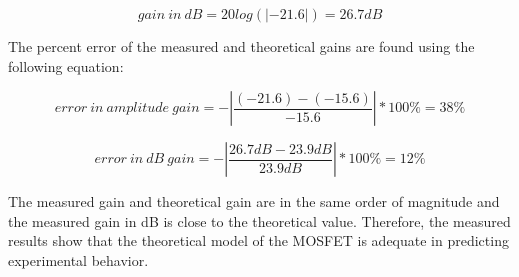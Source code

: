 \begin{equation}
	\label{eq:measured_gain_db}
	gain \ in \ dB = 20 log(|-21.6|) = 26.7 dB
\end{equation}

\FloatBarrier

The percent error of the measured and theoretical gains are found using the following equation:

\begin{equation}
	\label{eq:error}
	error \ in \ amplitude \ gain = - |\frac{(-21.6) - (-15.6)}{-15.6}| * 100\% = 38\%
\end{equation}

\begin{equation}
	\label{eq:error_db}
        error \ in \ dB \ gain = - |\frac{26.7 dB - 23.9 dB}{23.9 dB}| * 100\% = 12\%
\end{equation}

 The measured gain and theoretical gain are in the same order of magnitude and the measured gain in dB is close to the theoretical value.
 Therefore, the measured results show that the theoretical model of the MOSFET is adequate in predicting experimental behavior.
